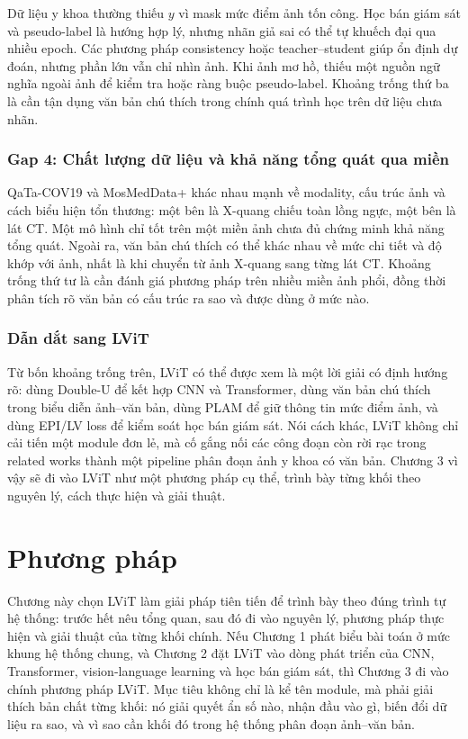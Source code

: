 Dữ liệu y khoa thường thiếu \(y\) vì mask mức điểm ảnh tốn công. Học bán giám sát và pseudo-label là hướng hợp lý, nhưng nhãn giả sai có thể tự khuếch đại qua nhiều epoch. Các phương pháp consistency hoặc teacher--student giúp ổn định dự đoán, nhưng phần lớn vẫn chỉ nhìn ảnh. Khi ảnh mơ hồ, thiếu một nguồn ngữ nghĩa ngoài ảnh để kiểm tra hoặc ràng buộc pseudo-label. Khoảng trống thứ ba là cần tận dụng văn bản chú thích trong chính quá trình học trên dữ liệu chưa nhãn.

\subsection{Gap 4: Chất lượng dữ liệu và khả năng tổng quát qua miền}

QaTa-COV19 và MosMedData+ khác nhau mạnh về modality, cấu trúc ảnh và cách biểu hiện tổn thương: một bên là X-quang chiếu toàn lồng ngực, một bên là lát CT. Một mô hình chỉ tốt trên một miền ảnh chưa đủ chứng minh khả năng tổng quát. Ngoài ra, văn bản chú thích có thể khác nhau về mức chi tiết và độ khớp với ảnh, nhất là khi chuyển từ ảnh X-quang sang từng lát CT. Khoảng trống thứ tư là cần đánh giá phương pháp trên nhiều miền ảnh phổi, đồng thời phân tích rõ văn bản có cấu trúc ra sao và được dùng ở mức nào.

\subsection{Dẫn dắt sang LViT}

Từ bốn khoảng trống trên, LViT có thể được xem là một lời giải có định hướng rõ: dùng Double-U để kết hợp CNN và Transformer, dùng văn bản chú thích trong biểu diễn ảnh--văn bản, dùng PLAM để giữ thông tin mức điểm ảnh, và dùng EPI/LV loss để kiểm soát học bán giám sát. Nói cách khác, LViT không chỉ cải tiến một module đơn lẻ, mà cố gắng nối các công đoạn còn rời rạc trong related works thành một pipeline phân đoạn ảnh y khoa có văn bản. Chương 3 vì vậy sẽ đi vào LViT như một phương pháp cụ thể, trình bày từng khối theo nguyên lý, cách thực hiện và giải thuật.

\chapter{Phương pháp}
\label{sec:method}

Chương này chọn LViT làm giải pháp tiên tiến để trình bày theo đúng trình tự hệ thống: trước hết nêu tổng quan, sau đó đi vào nguyên lý, phương pháp thực hiện và giải thuật của từng khối chính. Nếu Chương 1 phát biểu bài toán ở mức khung hệ thống chung, và Chương 2 đặt LViT vào dòng phát triển của CNN, Transformer, vision-language learning và học bán giám sát, thì Chương 3 đi vào chính phương pháp LViT. Mục tiêu không chỉ là kể tên module, mà phải giải thích bản chất từng khối: nó giải quyết ẩn số nào, nhận đầu vào gì, biến đổi dữ liệu ra sao, và vì sao cần khối đó trong hệ thống phân đoạn ảnh--văn bản.

